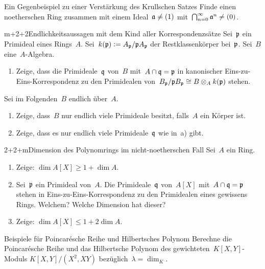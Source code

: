 \documentclass{uebblatt}
\begin{document}
\enlargethispage{1em}

\begin{aufgabe}{2}{Ein Gegenbeispiel zu einer Verstärkung des Krullschen Satzes}
Finde einen noetherschen Ring zusammen mit einem Ideal~$\mathfrak{a} \neq (1)$
mit~$\bigcap_{n=0}^\infty \mathfrak{a}^n \neq (0)$.
\end{aufgabe}

\begin{aufgabe}{m+2+2}{Endlichkeitsaussagen mit dem Kind aller Korrespondenzsätze}
Sei~$\mathfrak{p}$ ein Primideal eines Rings~$A$. Sei~$k(\mathfrak{p}) \vcentcolon= A_{\mathfrak{p}}/\mathfrak{p} A_{\mathfrak{p}}$
der Restklassenkörper bei~$\mathfrak{p}$. Sei~$B$ eine~$A$-Algebra.
\begin{enumerate}
\item Zeige, dass die Primideale~$\mathfrak{q}$
von~$B$ mit~$A \cap \mathfrak{q} = \mathfrak{p}$ in kanonischer Eins-zu-Eins-Korrespondenz zu
den Primidealen von~$B_{\mathfrak{p}}/\mathfrak{p} B_{\mathfrak{p}} \cong B \otimes_A k(\mathfrak{p})$ stehen.
\end{enumerate}
Sei im Folgenden~$B$ endlich über~$A$.
\begin{enumerate}
\addtocounter{enumi}{1}
\item Zeige, dass~$B$ nur endlich
viele Primideale besitzt, falls~$A$ ein Körper ist.
\item Zeige, dass es nur endlich viele
Primideale~$\mathfrak{q}$ wie in~a) gibt.
\end{enumerate}
\end{aufgabe}

\begin{aufgabe}{2+2+m}{Dimension des Polynomrings im nicht-noetherschen Fall}
Sei~$A$ ein Ring.
\begin{enumerate}
\item Zeige: $\dim A[X] \geq 1 + \dim A$.
\item Sei~$\mathfrak{p}$ ein Primideal von~$A$. Die Primideale~$\mathfrak{q}$
von~$A[X]$ mit~$A \cap \mathfrak{q} = \mathfrak{p}$ stehen in Eins-zu-Eins-Korrespondenz zu den
Primidealen eines gewissens Rings. Welchem? Welche Dimension hat dieser?
\item Zeige: $\dim A[X] \leq 1 + 2 \dim A$.
\end{enumerate}
\end{aufgabe}

\begin{aufgabe}{3}{Beispiele für Poincarésche Reihe und Hilbertsches Polynom}
Berechne die Poincarésche Reihe und das Hilbertsche Polynom des
gewichteten~$K[X,Y]$-Moduls $K[X,Y]/(X^2, XY)$ bezüglich~$\lambda = \dim_K$.
\end{aufgabe}
\end{document}

